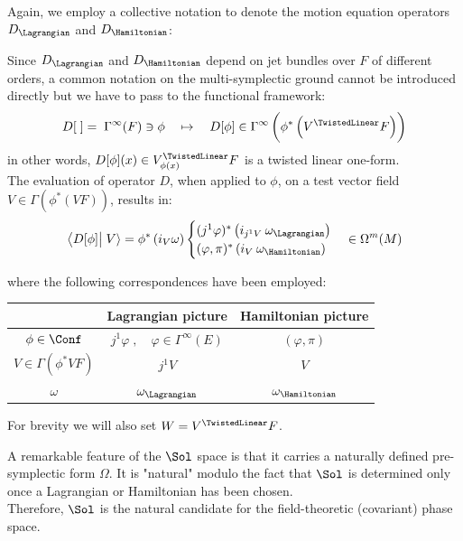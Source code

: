 \documentclass[a4paper,12pt,fleqn]{scrartcl}  %
\begin{document}
Again, we employ a collective notation to denote the motion equation operators $D_\Lagrangian$ and $D_\Hamiltonian$:
%
\begin{notation}
	Since $D_\Lagrangian$ and $D_\Hamiltonian$ depend on jet bundles over $F$ of different orders, a common notation on the multi-symplectic ground cannot be introduced directly
	but we have to pass to the functional framework:
\begin{displaymath}
	D[\; ] = \; \Gamma^\infty(F) \ni \phi \quad \mapsto \quad D[ \phi ] \in \Gamma^\infty \left( \phi^\ast \left(V^\TwistedLinear F \right)\right)
\end{displaymath}	
in other words, $D[\phi](x) \in V^\TwistedLinear_{\phi(x)}F$ is a twisted linear one-form.
\\
	The evaluation of operator $D$, when applied to $\phi$, on a test vector field $V \in \Gamma(\phi^\ast(VF))$, results in:
	\begin{displaymath}
		\left\langle D[\phi] \right\vert \left. V \right\rangle =
		\phi^\ast \left( i_V \omega \right) 
		\begin{cases}
			(j^1 \varphi)^\ast \left( i_{j^1V} \: \omega_\Lagrangian \right) \\
			(\varphi, \pi)^\ast \left( i_V \: \omega_\Hamiltonian \right)
		\end{cases}              
        \in \Omega^m(M)
	\end{displaymath}
	
	where the following correspondences have been employed:
	\begin{center}
		\begin{tabular}{|c|c|c|}
			\hline
			 & Lagrangian picture & Hamiltonian picture \\
			\hline
			$\phi \in \Conf$		&	$j^1 \varphi \; , \quad \varphi \in \Gamma^\infty(E)$		&	$(\varphi, \pi)$	\\
			$V \in \Gamma(\phi^\ast V F )$ & $j^1 V$ & $V$ \\
			$\omega$ & $\omega_\Lagrangian$ & $\omega_\Hamiltonian$ \\
			\hline
		\end{tabular}
	\end{center}	
	For brevity we will also set $	W = V^\TwistedLinear F $.
\end{notation}

A remarkable feature of the $\Sol$ space is that it carries a naturally defined pre-symplectic form $\Omega$.
	It is "natural" modulo the fact that $\Sol$ is determined only once a Lagrangian or Hamiltonian has been chosen.
\\
 Therefore, $\Sol$ is the natural candidate for the field-theoretic (covariant) phase space.
\end{document}
